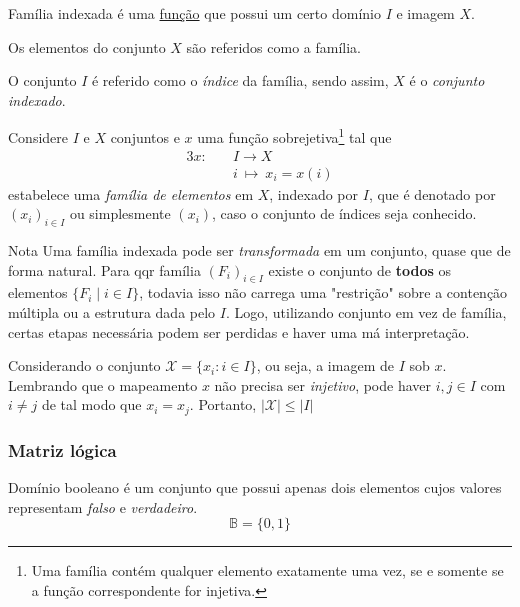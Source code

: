 Família indexada é uma \underline{função} que possui um certo domínio $\mathit{I}$ e imagem $X$.

Os elementos do conjunto $X$ são referidos como a família.

O conjunto $\mathit{I}$ é referido como o \textit{índice} da família, sendo assim, $X$ é o \textit{conjunto indexado}.
\begin{definition}
  Considere $I$ e $X$ conjuntos e $x$ uma função sobrejetiva\footnote[6]{Uma família contém qualquer elemento exatamente uma vez, se e somente se a função correspondente for injetiva.} tal que
    \begin{alignat*}{3}
      x:\quad &\mathit{I} \longrightarrow X\\
      &i\ \mapsto\ x_{i} = x(i)
    \end{alignat*}
estabelece uma \textit{família de elementos} em $X$, indexado por $\mathit{I}$, que é denotado por $(x_{i})_{i \in \mathit{I}}$ ou simplesmente $(x_{i})$, caso o conjunto de índices seja conhecido.
\end{definition}
\begin{mymdframed}{Nota}
  Uma família indexada pode ser \textit{transformada} em um conjunto, quase que de forma natural. Para qqr família $(F_{i})_{i\in \mathit{I}}$ existe o conjunto de \textbf{todos} os elementos $\{F_{i} \mid i \in \mathit{I}\}$, todavia isso não carrega uma "restrição" sobre a contenção múltipla ou a estrutura dada pelo $I$. Logo, utilizando conjunto em vez de família, certas etapas necessária podem ser perdidas e haver uma má interpretação.

  Considerando o conjunto $\mathcal{X} = \{x_{i}: i\in \mathit{I}\}$, ou seja, a imagem de $I$ sob $x$. Lembrando que o mapeamento $x$ não precisa ser \textit{injetivo}, pode haver $i,j \in I$ com $i \neq j$ de tal modo que $x_{i} = x_{j}$. Portanto, $ | \mathcal{X} |  \leq | \mathit{I} | $  
\end{mymdframed}
\subsubsection{Matriz lógica}
\begin{definition}
  Domínio booleano é um conjunto que possui apenas dois elementos cujos valores representam \textit{falso} e \textit{verdadeiro}.
  $$\mathbb{B} = \{0,1\}$$
\end{definition}
